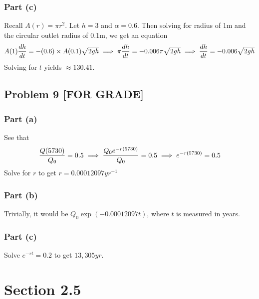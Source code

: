 \documentclass[12pt]{article}
\begin{document}
\subsubsection*{Part (c)}
\label{sec:org444f789}
Recall \(A(r) = \pi r^2\). Let \(h=3\) and \(\alpha = 0.6\). Then solving for
radius of 1m and the circular outlet radius of 0.1m, we get an equation
\begin{equation*}
  A(1)\frac{dh}{dt} = -(0.6) \times A(0.1) \sqrt{2gh}\\
  \implies \pi\frac{dh}{dt} = -0.006 \pi \sqrt{2gh}\\
  \implies \frac{dh}{dt} = -0.006 \sqrt{2gh}\\
\end{equation*}
Solving for \(t\) yields \(\approx 130.41\). 
\subsection*{Problem 9 [FOR GRADE]}
\label{sec:orgf1dee81}
\subsubsection*{Part (a)}
\label{sec:org77b8378}
See that
\begin{equation*}
  \frac{Q(5730)}{Q_0} = 0.5\\
  \implies \frac{Q_0 e^{-r(5730)}}{Q_0} = 0.5\\
  \implies e^{-r(5730)} = 0.5\\
\end{equation*}
Solve for \(r\) to get \(r = 0.00012097 yr^{-1}\) 
\subsubsection*{Part (b)}
\label{sec:org152372c}
Trivially, it would be \(Q_0 \exp{(-0.00012097t)}\), where \(t\) is measured in
years. 
\subsubsection*{Part (c)}
\label{sec:orgc28cd72}
Solve \(e^{-rt} = 0.2\) to get \(13,305yr\). 
\section*{Section 2.5}
\label{sec:org1b87d5b}
\end{document}

